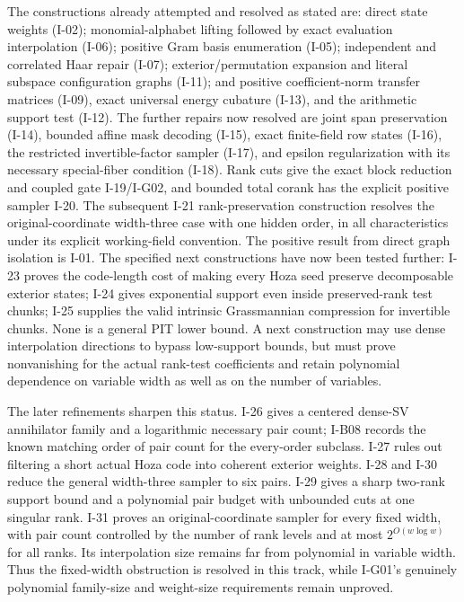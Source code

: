 \documentclass[11pt,a4paper]{article}
\theoremstyle{definition}\newtheorem{definition}{Definition}
\begin{document}
The constructions already attempted and resolved as stated are:
direct state weights (I-02); monomial-alphabet lifting followed
by exact evaluation interpolation (I-06); positive Gram basis
enumeration (I-05); independent and correlated Haar repair
(I-07); exterior/permutation expansion and literal subspace
configuration graphs (I-11); and positive coefficient-norm
transfer matrices (I-09), exact universal energy cubature (I-13),
and the arithmetic support test (I-12).  The further repairs now
resolved are joint span preservation (I-14), bounded affine mask
decoding (I-15), exact finite-field row states (I-16), the restricted
invertible-factor sampler (I-17), and epsilon regularization with
its necessary special-fiber condition (I-18).  Rank cuts give the exact
block reduction and coupled gate I-19/I-G02, and bounded total corank
has the explicit positive sampler I-20.  The subsequent I-21
rank-preservation construction resolves the original-coordinate
width-three case with one hidden order, in all characteristics
under its explicit working-field convention.  The positive result from
direct graph isolation is I-01.  The specified next constructions have now been tested further:
I-23 proves the code-length cost of making every Hoza seed preserve
decomposable exterior states; I-24 gives exponential support even
inside preserved-rank test chunks; I-25 supplies the valid intrinsic
Grassmannian compression for invertible chunks.  None is a general
PIT lower bound.  A next construction may use dense interpolation
directions to bypass low-support bounds, but must prove nonvanishing
for the actual rank-test coefficients and retain polynomial dependence
on variable width as well as on the number of variables.

The later refinements sharpen this status.  I-26 gives a centered dense-SV
annihilator family and a logarithmic necessary pair count; I-B08 records
the known matching order of pair count for the every-order subclass.
I-27 rules out filtering a short actual Hoza code into coherent exterior
weights.  I-28 and I-30 reduce the general width-three sampler to six
pairs.  I-29 gives a sharp two-rank support bound and a polynomial pair
budget with unbounded cuts at one singular rank.  I-31 proves an
original-coordinate sampler for every fixed width, with pair count
controlled by the number of rank levels and at most
$2^{O(w\log w)}$ for all ranks.  Its interpolation size remains far
from polynomial in variable width.  Thus the fixed-width obstruction
is resolved in this track, while I-G01's genuinely polynomial
family-size and weight-size requirements remain unproved.
\end{document}
